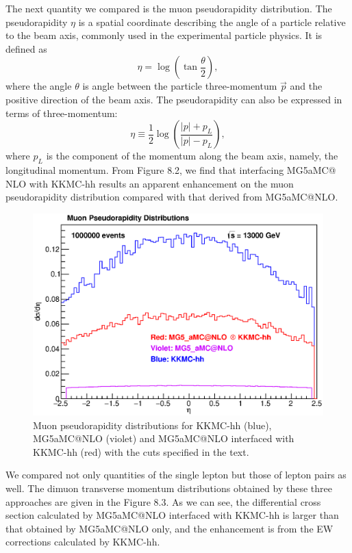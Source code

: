 The next quantity we compared is the muon pseudorapidity distribution. The pseudorapidity $\eta$ is a spatial coordinate describing the angle of a particle relative to the beam axis, commonly used in the experimental particle physics. It is defined as 
\begin{equation}
\eta=\log\left(\tan\frac{\theta}{2}\right),
\end{equation} 
where the angle $\theta$ is angle between the particle three-momentum $\vec{p}$ and the positive direction of the beam axis. The pseudorapidity can also be expressed in terms of three-momentum:
\begin{equation}
\eta\equiv\frac{1}{2}\log\left(\frac{|p|+p_L}{|p|-p_L}\right),
\end{equation}
where $p_L$ is the component of the momentum along the beam axis, namely, the longitudinal momentum. From Figure 8.2, we find that interfacing MG5\textunderscore aMC@\newline
NLO with KKMC-hh results an apparent enhancement on the muon pseudorapidity distribution compared with that derived from MG5\textunderscore aMC@NLO.
\begin{figure}
	\begin{center}
		\includegraphics[scale=0.65]{ETA.eps}
		\caption{ Muon pseudorapidity distributions for KKMC-hh (blue), MG5\textunderscore aMC@NLO (violet) and MG5\textunderscore aMC@NLO interfaced with KKMC-hh (red) with the cuts specified in the text. }
	\end{center}
	\end{figure}

We compared not only quantities of the single lepton but those of lepton pairs as well. The dimuon transverse momentum distributions obtained by these three approaches are given in the Figure 8.3. As we can see, the differential cross section calculated by MG5\textunderscore aMC@NLO interfaced with KKMC-hh is larger than that obtained by MG5\textunderscore aMC@NLO only, and the enhancement is from the EW corrections calculated by KKMC-hh. 

